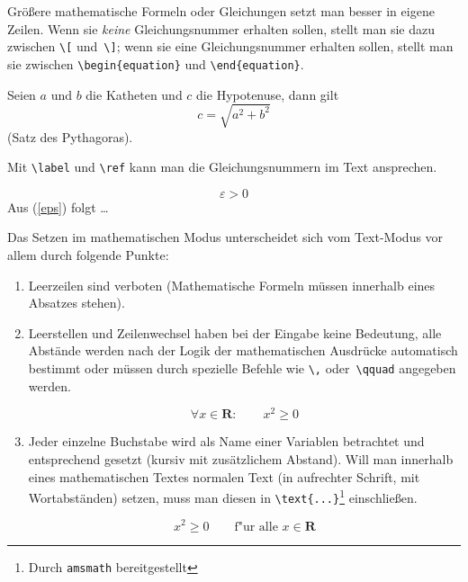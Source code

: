 Größere mathematische Formeln oder Gleichungen setzt man besser
in eigene Zeilen. Wenn sie \emph{keine} Gleichungsnummer erhalten
sollen, stellt man sie dazu zwischen \lstinline|\[| und~\lstinline|\]|;
wenn sie eine Gleichungsnummer erhalten sollen, stellt man sie
zwischen \lstinline|\begin{equation}| und \lstinline|\end{equation}|.

\begin{LTXexample}
Seien $a$ und $b$ die Katheten
und $c$ die Hypotenuse,
dann gilt
\begin{equation}
c = \sqrt{  a^{2}+b^{2}  }
\end{equation}
(Satz des Pythagoras).
\end{LTXexample}


Mit \lstinline|\label| und \lstinline|\ref| kann man die Gleichungsnummern
im Text ansprechen.

\let\origlabel\label
\begin{LTXexample}[preset=\let\label\origlabel]
\begin{equation} \label{eps}
\varepsilon > 0
\end{equation}
 Aus (\ref{eps}) folgt \dots
\end{LTXexample}



Das Setzen im mathematischen Modus unterscheidet sich vom
Text-Modus vor allem durch folgende Punkte:
\begin{enumerate}
\item Leerzeilen sind verboten (Mathematische Formeln müssen
  innerhalb eines Absatzes stehen).

\item Leerstellen und Zeilenwechsel haben bei der Eingabe keine
  Bedeutung, alle Abstände werden nach der Logik der
  mathematischen Ausdrücke automatisch bestimmt oder müssen
  durch spezielle Befehle wie \lstinline|\,| oder~\lstinline|\qquad|
  angegeben werden.

\begin{LTXexample}
\begin{equation}
\forall x \in \mathbf{R}:
\qquad x^{2} \geq 0
\end{equation}
\end{LTXexample}


\item Jeder einzelne Buchstabe wird als Name einer Variablen
  betrachtet und entsprechend gesetzt (kursiv mit
  zusätzlichem Abstand).  Will man innerhalb eines
  mathematischen Textes normalen Text (in aufrechter Schrift, mit
  Wortabständen) setzen, muss man diesen in
  \lstinline|\text{...}|\footnote{Durch \texttt{amsmath} bereitgestellt} einschließen.

\begin{LTXexample}
\begin{equation}
x^{2} \geq 0\qquad
\text{f"ur alle }
x \in \mathbf{R}
\end{equation}
\end{LTXexample}



\end{enumerate}

